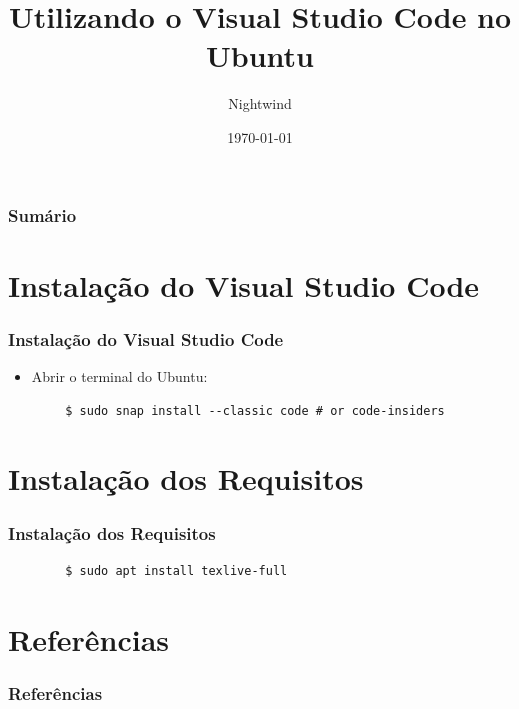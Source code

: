 \documentclass{beamer}
\title{Utilizando o Visual Studio Code no Ubuntu}
\author{Nightwind}
\institute[CTISM]{Colégio Técnico Industrial de Santa Maria}
\date{\today}
\begin{document}
\frame{\titlepage}

\begin{frame}
    \frametitle{Sumário}
    \tableofcontents
\end{frame}

\section{Instalação do Visual Studio Code}

\begin{frame}[fragile]
    \frametitle{Instalação do Visual Studio Code}
    \begin{itemize}
        \item Abrir o terminal do Ubuntu: 
    \end{itemize}
    \begin{lstlisting}
        $ sudo snap install --classic code # or code-insiders
    \end{lstlisting}
\end{frame}


\section{Instalação dos Requisitos}
\begin{frame}[fragile]
    \frametitle{Instalação dos Requisitos}
    \begin{lstlisting}
        $ sudo apt install texlive-full
    \end{lstlisting}
\end{frame}

\section{Referências}

\begin{frame}[allowframebreaks]
    \frametitle{Referências}
    \nocite{TeXLiveUbuntu,VisualStudioCodeUbuntu}
    \printbibliography[]
\end{frame}
\end{document}
